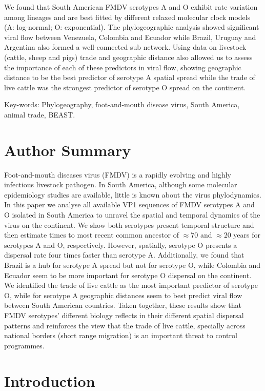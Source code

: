 \documentclass[10pt]{article}
\begin{document}
We found that South American FMDV serotypes A and O exhibit rate variation among lineages and are best fitted by different relaxed molecular clock models (A: log-normal; O: exponential).
The phylogeographic analysis showed significant viral flow between Venezuela, Colombia and Ecuador while Brazil, Uruguay and Argentina also formed a well-connected sub network.
Using data on livestock (cattle, sheep and pigs) trade and geographic distance also allowed us to assess the importance of each of these predictors in viral flow, showing geographic distance to be the best predictor of serotype A spatial spread while the trade of live cattle was the strongest predictor of serotype O spread on the continent.

Key-words: Phylogeography, foot-and-mouth disease virus, South America, animal trade, BEAST.

\section*{Author Summary} %
Foot-and-mouth diseases virus (FMDV) 
is a rapidly evolving and highly infectious livestock pathogen.
In South America, although some molecular epidemiology studies are available, little is known about the virus phylodynamics.
In this paper we analyse all available VP1 sequences of FMDV serotypes A and O isolated in South America to unravel the spatial and temporal dynamics of the virus on the continent.
We show both serotypes present temporal structure and then estimate times to most recent common ancestor of $\approx 70$ and $\approx 20$ years for serotypes A and O, respectively. 
However, spatially, serotype O presents a dispersal rate four times faster than serotype A.
Additionally, we found that Brazil is a hub for serotype A spread but not for serotype O, while Colombia and Ecuador seem to be more important for serotype O dispersal on the continent.
We identified the trade of live cattle as the most important predictor of serotype O, while for serotype A geographic distances seem to best predict viral flow between South American countries.
Taken together, these results show that FMDV serotypes' different biology reflects in their different spatial dispersal patterns and reinforces the view that the trade of live cattle, specially across national borders (short range migration) is an important threat to control programmes.   

\section*{Introduction}
\end{document}
